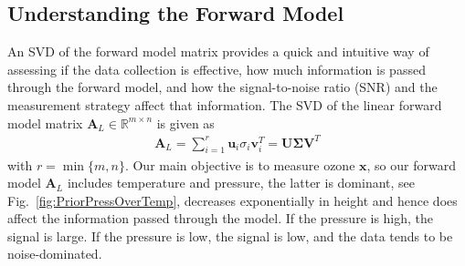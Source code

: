 \subsection{Understanding the Forward Model}
\label{sec:SVD}
An SVD of the forward model matrix provides a quick and intuitive way of assessing if the data collection is effective, how much information is passed through the forward model, and how the signal-to-noise ratio (SNR) and the measurement strategy affect that information.
The SVD of the linear forward model matrix $\bm{A}_L \in \mathbb{R}^{m \times n}$ is given as
\begin{align}
	\bm{A}_L = \sum_{i =1}^{r} \bm{u}_i  \sigma_i \bm{v}^T_i = \bm{U} \bm{\Sigma} \bm{V}^T
\end{align}
with $r = \min\{m,n\}$.
Our main objective is to measure ozone $\bm{x}$, so our forward model $\bm{A}_L$ includes temperature and pressure, the latter is dominant, see Fig.~\ref{fig:PriorPressOverTemp}, decreases exponentially in height and hence does affect the information passed through the model.
If the pressure is high, the signal is large.
If the pressure is low, the signal is low, and the data tends to be noise-dominated.

